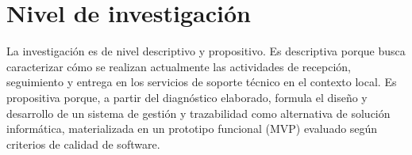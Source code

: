 \section{Nivel de investigación}

La investigación es de nivel descriptivo y propositivo. Es descriptiva porque busca caracterizar cómo se realizan actualmente las actividades de recepción, seguimiento y entrega en los servicios de soporte técnico en el contexto local. Es propositiva porque, a partir del diagnóstico elaborado, formula el diseño y desarrollo de un sistema de gestión y trazabilidad como alternativa de solución informática, materializada en un prototipo funcional (MVP) evaluado según criterios de calidad de software.